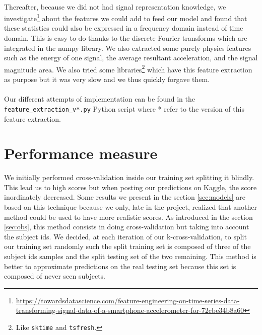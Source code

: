 \documentclass[a4paper, 11pt, oneside]{article}
\begin{document}
\paragraph{}Thereafter, because we did not had signal representation knowledge, we investigate\footnote{\url{https://towardsdatascience.com/feature-engineering-on-time-series-data-transforming-signal-data-of-a-smartphone-accelerometer-for-72cbe34b8a60}} about the features we could add to feed our model and found that these statistics could also be expressed in a frequency domain instead of time domain. This is easy to do thanks to the discrete Fourier transforms which are integrated in the numpy library.
We also extracted some purely physics features such as the energy of one signal, the average resultant acceleration, and the signal magnitude area. We also tried some libraries\footnote{Like \texttt{sktime} and \texttt{tsfresh}.} which have this feature extraction as purpose but it was very slow and we thus quickly forgave them.

\paragraph{}Our different attempts of implementation can be found in the \texttt{feature\_extraction\_v*.py} Python script where * refer to the version of this feature extraction.


\section{Performance measure}
We initially performed cross-validation inside our training set splitting it blindly. This lead us to high scores but when posting our predictions on Kaggle, the score inordinately decreased. Some results we present in the section \ref{sec:models} are based on this technique because we only, late in the project, realized that another method could be used to have more realistic scores.
As introduced in the section \ref{sec:obs}, this method consists in doing cross-validation but taking into account the subject ids. We decided, at each iteration of our k-cross-validation, to split our training set randomly such the split training set is composed of three of the subject ids samples and the split testing set of the two remaining. This method is better to approximate predictions on the real testing set because this set is composed of never seen subjects.
\end{document}
